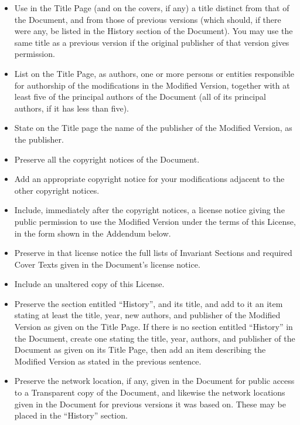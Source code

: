     \begin{itemize}

    \item Use in the Title Page (and on the covers, if any) a title distinct
    from that of the Document, and from those of previous versions
    (which should, if there were any, be listed in the History section
    of the Document).  You may use the same title as a previous version
    if the original publisher of that version gives permission.
    \item List on the Title Page, as authors, one or more persons or entities
    responsible for authorship of the modifications in the Modified
    Version, together with at least five of the principal authors of the
    Document (all of its principal authors, if it has less than five).
    \item State on the Title page the name of the publisher of the
    Modified Version, as the publisher.
    \item Preserve all the copyright notices of the Document.
    \item Add an appropriate copyright notice for your modifications
    adjacent to the other copyright notices.
    \item Include, immediately after the copyright notices, a license notice
    giving the public permission to use the Modified Version under the
    terms of this License, in the form shown in the Addendum below.
    \item Preserve in that license notice the full lists of Invariant Sections
    and required Cover Texts given in the Document's license notice.
    \item Include an unaltered copy of this License.
    \item Preserve the section entitled ``History'', and its title, and add to
    it an item stating at least the title, year, new authors, and
    publisher of the Modified Version as given on the Title Page.  If
    there is no section entitled ``History'' in the Document, create one
    stating the title, year, authors, and publisher of the Document as
    given on its Title Page, then add an item describing the Modified
    Version as stated in the previous sentence.
    \item Preserve the network location, if any, given in the Document for
    public access to a Transparent copy of the Document, and likewise
    the network locations given in the Document for previous versions
    it was based on.  These may be placed in the ``History'' section.

\end{itemize}
